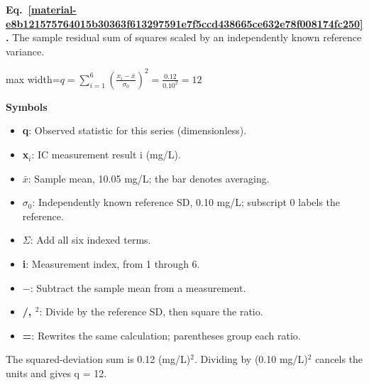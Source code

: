 \documentclass[11pt,a4paper]{article}
\begin{document}
\par\medskip
\noindent\begin{minipage}{\linewidth}
\label{material-e8b121575764015b30363f613297591e7f5ccd438665ce632e78f008174fc250}
\noindent\textbf{Eq.~\ref*{material-e8b121575764015b30363f613297591e7f5ccd438665ce632e78f008174fc250}.} The sample residual sum of squares scaled by an independently known reference variance.\par\nopagebreak
\begin{center}\begin{adjustbox}{max width=\linewidth}$\displaystyle q=\sum_{i=1}^{6}\left(\frac{x_i-\bar x}{\sigma_0}\right)^2=\frac{0.12}{0.10^2}=12$\end{adjustbox}\end{center}

\par\noindent\textbf{Symbols}

\begin{itemize}\setlength{\itemsep}{1pt}\setlength{\parsep}{0pt}
\item \textbf{q}: Observed statistic for this series (dimensionless).
\item \textbf{x\ensuremath{{}_i}}: IC measurement result i (mg/L).
\item \textbf{\ensuremath{\bar{x}}}: Sample mean, 10.05 mg/L; the bar denotes averaging.
\item \textbf{\ensuremath{\sigma}\ensuremath{{}_0}}: Independently known reference SD, 0.10 mg/L; subscript 0 labels the reference.
\end{itemize}

\begin{itemize}\setlength{\itemsep}{1pt}\setlength{\parsep}{0pt}
\item \textbf{\ensuremath{\Sigma}}: Add all six indexed terms.
\item \textbf{i}: Measurement index, from 1 through 6.
\item \textbf{\ensuremath{-}}: Subtract the sample mean from a measurement.
\item \textbf{/, \ensuremath{{}^2}}: Divide by the reference SD, then square the ratio.
\item \textbf{=}: Rewrites the same calculation; parentheses group each ratio.
\end{itemize}

The squared-deviation sum is 0.12 (mg/L)\ensuremath{{}^2}. Dividing by (0.10 mg/L)\ensuremath{{}^2} cancels the units and gives q = 12.

\end{minipage}\par
\medskip
\end{document}
